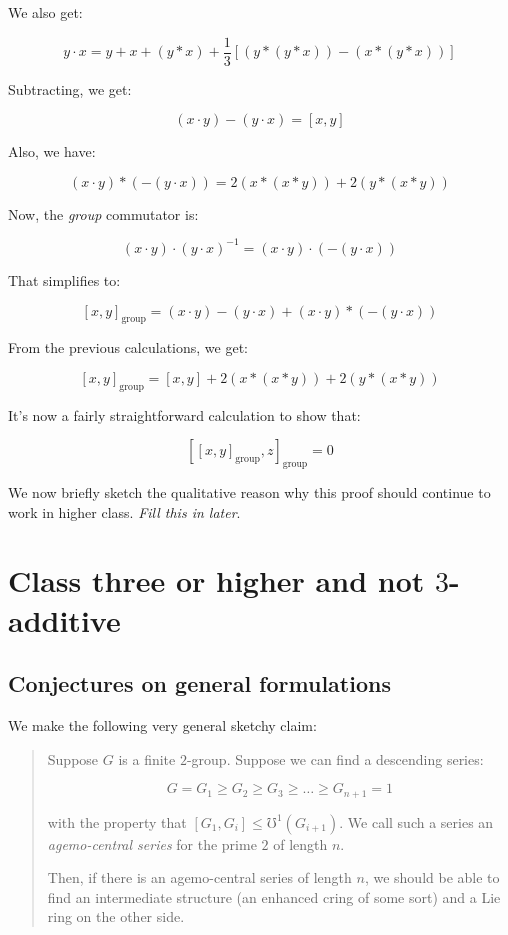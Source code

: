 \documentclass[10pt]{amsart}
\begin{document}
We also get:

$$y \cdot x = y + x + (y * x) + \frac{1}{3}[(y * (y * x)) - (x * (y * x))]$$

Subtracting, we get:

$$(x \cdot y) - (y \cdot x) = [x,y]$$

Also, we have:

$$(x \cdot y) * (-(y \cdot x)) = 2(x * (x * y)) + 2(y * (x * y))$$

Now, the {\em group} commutator is:

$$(x \cdot y) \cdot (y \cdot x)^{-1} = (x \cdot y) \cdot (-(y \cdot x))$$

That simplifies to:

$$[x,y]_{\text{group}} = (x \cdot y) - (y \cdot x) + (x \cdot y) * (-(y \cdot x))$$
 
From the previous calculations, we get:

$$[x,y]_{\text{group}} = [x,y] +  2(x * (x * y)) + 2(y * (x * y))$$

It's now a fairly straightforward calculation to show that:

$$[[x,y]_{\text{group}},z]_{\text{group}} = 0$$

We now briefly sketch the qualitative reason why this proof should
continue to work in higher class. {\em Fill this in later}.

\section{Class three or higher and not $3$-additive}
\subsection{Conjectures on general formulations}

We make the following very general sketchy claim:

\begin{quote}
  Suppose $G$ is a finite $2$-group. Suppose we can find a descending series:

  $$G = G_1 \ge G_2 \ge G_3 \ge \dots \ge G_{n+1} = 1$$

  with the property that $[G_1,G_i] \le \mho^1(G_{i+1})$. We call such
  a series an {\em agemo-central series} for the prime $2$ of length $n$.

  Then, if there is an agemo-central series of length $n$, we should
  be able to find an intermediate structure (an enhanced cring of some
  sort) and a Lie ring on the other side.
\end{quote}
\end{document}
